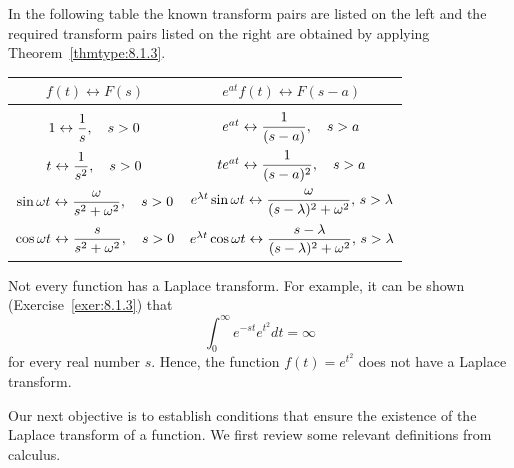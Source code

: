 \begin{examplesolution}
\solution In the following table the known transform pairs are listed on the left and the required
transform pairs listed on the right are obtained by applying Theorem~\ref{thmtype:8.1.3}.

\begin{center}
  \begin{tabular}{|c|c|}
    \hline
    $f(t)\leftrightarrow F(s)$                                                   & $e^{at}f(t)\leftrightarrow F(s-a)$                                                                       \\
    \hline
                                                                                 &                                                                                                          \\[9pt]
    $1\leftrightarrow\displaystyle\frac{1}{s},\quad s>0$                                  & $e^{at}\leftrightarrow\displaystyle\frac{1}{(s-a)},\quad s>a$                                                     \\[9pt]
    $t\leftrightarrow\displaystyle{\frac{1}{s^{2}}},\quad s>0$                            & $te^{at}\leftrightarrow\displaystyle{\frac{1}{(s-a)^{2}}},\quad s>a$                                              \\[9pt]
    $\sin\omega t\leftrightarrow\displaystyle{\frac{\omega}{s^{2}+\omega^{2}}},\quad s>0$ & $e^{\lambda t}\sin\omega t\leftrightarrow\displaystyle{\frac{\omega}{(s-\lambda)^{2}+\omega^{2}}},\,s>\lambda$    \\[9pt]
    $\cos\omega t\leftrightarrow\displaystyle{\frac{s}{s^{2}+\omega^{2}}},\quad s>0$      & $e^{\lambda t}\cos\omega t\leftrightarrow\displaystyle{\frac{s-\lambda}{(s-\lambda)^{2}+\omega^{2}}},\,s>\lambda$ \\[9pt]
    \hline
  \end{tabular}
\end{center}
\end{examplesolution}


\noindent
Not every function has a Laplace transform. For example, it can be shown (Exercise~\ref{exer:8.1.3})
that
\[
  \int_{0}^{\infty}e^{-st}e^{t^{2}}dt=\infty
\]
for every real number $s$. Hence, the function $f(t)=e^{t^{2}}$ does not have a Laplace transform.

Our next objective is to establish conditions that ensure the existence of the Laplace transform of
a function. We first review some relevant definitions from calculus.

